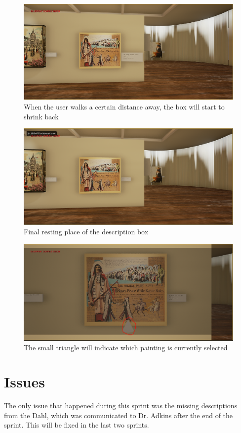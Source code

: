 	\begin{figure}
		\caption{When the user walks a certain distance away, the box will start to shrink back}
		\includegraphics[scale=0.5]{Screenshots/Animation4.png}
		\centering
	\end{figure}
	\begin{figure}
		\caption{Final resting place of the description box}
		\includegraphics[scale=0.5]{Screenshots/Animation5.png}
		\centering
	\end{figure}


	\begin{figure}
		\caption{The small triangle will indicate which painting is currently selected}
		\includegraphics[scale=0.5]{Screenshots/Menu.png}
		\centering
	\end{figure}

\section*{Issues}
The only issue that happened during this sprint was the missing descriptions from the Dahl, which was communicated to Dr. Adkins after the end of the sprint.  This will be fixed in the last two sprints.


